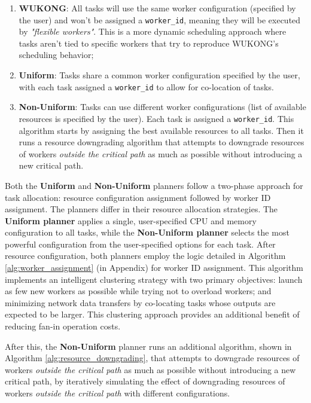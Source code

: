 \documentclass[conference]{IEEEtran}
\begin{document}
\begin{enumerate}
    \item \textbf{WUKONG}: All tasks will use the same worker configuration (specified by the user) and won't be assigned a \texttt{worker\_id}, meaning they will be executed by \textit{"flexible workers"}. This is a more dynamic scheduling approach where tasks aren't tied to specific workers that try to reproduce WUKONG's scheduling behavior;
    \item \textbf{Uniform}: Tasks share a common worker configuration specified by the user, with each task assigned a \texttt{worker\_id} to allow for co-location of tasks.
    \item \textbf{Non-Uniform}: Tasks can use different worker configurations (list of available resources is specified by the user). Each task is assigned a \texttt{worker\_id}. This algorithm starts by assigning the best available resources to all tasks. Then it runs a resource downgrading algorithm that attempts to downgrade resources of workers \textit{outside the critical path} as much as possible without introducing a new critical path.
\end{enumerate}

Both the \textbf{Uniform} and \textbf{Non-Uniform} planners follow a two-phase approach for task allocation: resource configuration assignment followed by worker ID assignment. The planners differ in their resource allocation strategies. The \textbf{Uniform planner} applies a single, user-specified CPU and memory configuration to all tasks, while the \textbf{Non-Uniform planner} selects the most powerful configuration from the user-specified options for each task. After resource configuration, both planners employ the logic detailed in Algorithm \ref{alg:worker_assignment} (in Appendix) for worker ID assignment. This algorithm implements an intelligent clustering strategy with two primary objectives: launch as few new workers as possible while trying not to overload workers; and minimizing network data transfers by co-locating tasks whose outputs are expected to be larger. This clustering approach provides an additional benefit of reducing fan-in operation costs.

After this, the \textbf{Non-Uniform} planner runs an additional algorithm, shown in Algorithm \ref{alg:resource_downgrading}, that attempts to downgrade resources of workers \textit{outside the critical path} as much as possible without introducing a new critical path, by iteratively simulating the effect of downgrading resources of workers \textit{outside the critical path} with different configurations.
\end{document}
